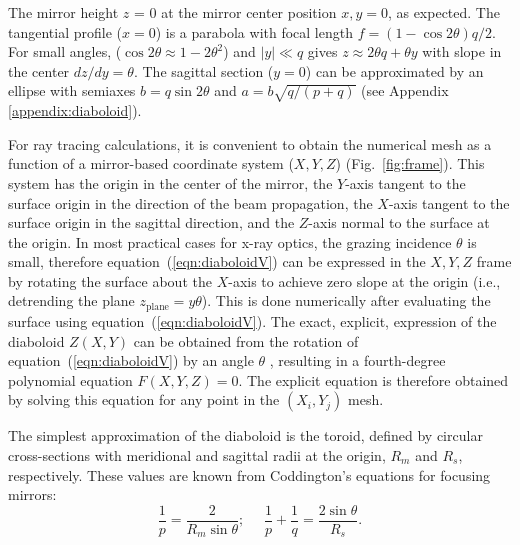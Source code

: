 \documentclass{iucr}       %
\begin{document}
The mirror height $z$ = 0 at the mirror center position $x, y = 0$, as expected. The tangential profile ($x=0$) is a parabola with focal length $ f = (1-\cos2\theta) q/2$. For small angles, ($\cos2\theta\approx 1 - 2\theta^2$) and $|y|\ll q$ gives $z\approx 2 \theta q + \theta y$ with slope in the center $dz/dy=\theta$. The sagittal section ($y=0$) can be approximated by an ellipse with semiaxes $b=q \sin2\theta$ and $a=b \sqrt{q /(p+q)}$ (see Appendix \ref{appendix:diaboloid}). 

For ray tracing calculations, it is convenient to obtain the numerical mesh as a function of a mirror-based coordinate system ($X,Y,Z$) (Fig.~\ref{fig:frame}). This system has the origin in the center of the mirror, the $Y$-axis tangent to the surface origin in the direction of the beam propagation, the $X$-axis tangent to the surface origin in the sagittal direction, and the $Z$-axis normal to the surface at the origin. In most practical cases for x-ray optics, the grazing incidence $\theta$ is small, therefore equation~(\ref{eqn:diaboloidV}) can be expressed in the $X,Y,Z$ frame by rotating the surface about the $X$-axis to achieve zero slope at the origin (i.e., detrending the plane $z_{\mathrm{plane}}=y \theta$). This is done numerically after evaluating the surface using equation~(\ref{eqn:diaboloidV}). The exact, explicit, expression of the diaboloid $Z(X,Y)$ can be obtained from the rotation of equation~(\ref{eqn:diaboloidV}) by an angle $\theta$ \cite{val2021}, resulting in a fourth-degree polynomial equation $F(X,Y,Z)=0$. The explicit equation is therefore obtained by solving this equation for any point in the $(X_i,Y_j)$ mesh.


The simplest approximation of the diaboloid is the toroid, defined by circular cross-sections with meridional and sagittal radii at the origin, $R_m$ and $R_s$, respectively. These values are known from Coddington's equations for focusing mirrors:
\begin{equation}
\label{eqn:radii}
\frac{1}{p} = \frac{2 }{R_m \sin\theta };~~~~~~
\frac{1}{p} + \frac{1}{q} = \frac{2\sin\theta}{ R_s}.
\end{equation}

\end{document}
